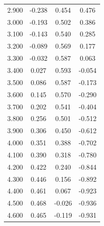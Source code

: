 \begin{table}[!t]
\begin{center}
\begin{tabular}{cccc}
2.900  &  -0.238  &  0.454  &  0.476\\
3.000  &  -0.193  &  0.502  &  0.386\\
3.100  &  -0.143  &  0.540  &  0.285\\
3.200  &  -0.089  &  0.569  &  0.177\\
3.300  &  -0.032  &  0.587  &  0.063\\
3.400  &  0.027  &  0.593  &  -0.054\\
3.500  &  0.086  &  0.587  &  -0.173\\
3.600  &  0.145  &  0.570  &  -0.290\\
3.700  &  0.202  &  0.541  &  -0.404\\
3.800  &  0.256  &  0.501  &  -0.512\\
3.900  &  0.306  &  0.450  &  -0.612\\
4.000  &  0.351  &  0.388  &  -0.702\\
4.100  &  0.390  &  0.318  &  -0.780\\
4.200  &  0.422  &  0.240  &  -0.844\\
4.300  &  0.446  &  0.156  &  -0.892\\
4.400  &  0.461  &  0.067  &  -0.923\\
4.500  &  0.468  &  -0.026  &  -0.936\\
4.600  &  0.465  &  -0.119  &  -0.931\\

\end{tabular}
\end{center}
\label{table:numerical1}
\end{table}



